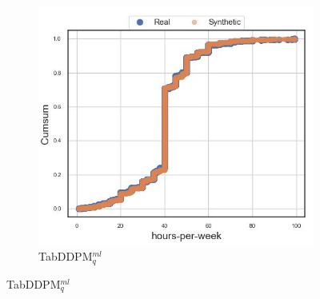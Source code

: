 \begin{figure}[H]
	\begin{subfigure}{0.3\textwidth}
		\centering
		\includegraphics[width=\textwidth]{images/cdf_hpw/tab-ddpm.jpg}
		\caption{TabDDPM$^{ml}_q$}
	\end{subfigure}



\end{figure}
